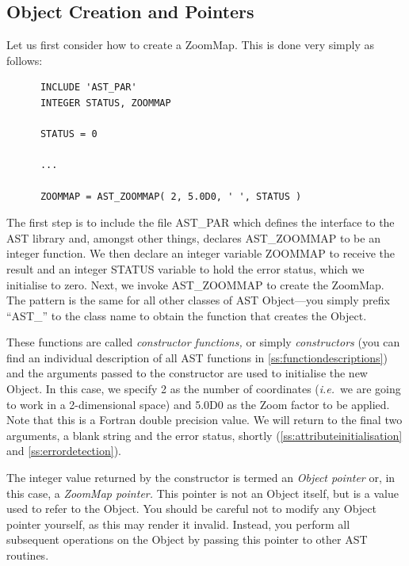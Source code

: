 \documentclass[twoside,11pt]{article}
\newcommand{\htmlref}[2]{#1}
\newcommand{\appref}[1]{Appendix~\ref{#1}}
\newcommand{\secref}[1]{\S\ref{#1}}
\renewcommand{\appref}[1]{\ref{#1}}
\renewcommand{\secref}[1]{\ref{#1}}
\begin{document}
\subsection{\label{ss:objectcreation}Object Creation and Pointers}

Let us first consider how to create a \htmlref{ZoomMap}{ZoomMap}. This is done very
simply as follows:

\small
\begin{verbatim}
      INCLUDE 'AST_PAR'
      INTEGER STATUS, ZOOMMAP

      STATUS = 0

      ...

      ZOOMMAP = AST_ZOOMMAP( 2, 5.0D0, ' ', STATUS )
\end{verbatim}
\normalsize

The first step is to include the file AST\_PAR which defines the
interface to the AST library and, amongst other things, declares
\htmlref{AST\_ZOOMMAP}{AST_ZOOMMAP} to be an integer function.  We then declare an integer
variable ZOOMMAP to receive the result and an integer STATUS variable
to hold the error status, which we initialise to zero. Next, we invoke
AST\_ZOOMMAP to create the ZoomMap. The pattern is the same for all
other classes of AST \htmlref{Object}{Object}---you simply prefix ``AST\_'' to the class
name to obtain the function that creates the Object.

These functions are called {\em{constructor functions,}} or simply
{\em{constructors}} (you can find an individual description of all AST
functions in \appref{ss:functiondescriptions}) and the arguments
passed to the constructor are used to initialise the new Object. In
this case, we specify 2 as the number of coordinates ({\em{i.e.}}\ we
are going to work in a 2-dimensional
space) and 5.0D0 as the \htmlref{Zoom}{Zoom} factor to be applied. Note that this is a
Fortran double precision value. We will return to the final two
arguments, a blank string and the error status, shortly
(\secref{ss:attributeinitialisation} and \secref{ss:errordetection}).

The integer value returned by the constructor is termed an {\em{Object
pointer}} or, in this case, a {\em{ZoomMap pointer.}} This pointer is not
an Object itself, but is a value used to refer to the Object. You
should be careful not to modify any Object pointer yourself, as this
may render it invalid. Instead, you perform all subsequent operations
on the Object by passing this pointer to other AST routines.
\end{document}

